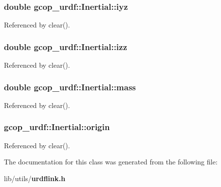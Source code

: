 \subsubsection[{iyz}]{\setlength{\rightskip}{0pt plus 5cm}double {\bf gcop\-\_\-urdf\-::\-Inertial\-::iyz}}\label{classgcop__urdf_1_1Inertial_adeb4c3709ef7e2b95e59c254ea6e0fdd}


\-Referenced by clear().

\subsubsection[{izz}]{\setlength{\rightskip}{0pt plus 5cm}double {\bf gcop\-\_\-urdf\-::\-Inertial\-::izz}}\label{classgcop__urdf_1_1Inertial_a3c72ecbab785b84c84880445a9ea946f}


\-Referenced by clear().

\subsubsection[{mass}]{\setlength{\rightskip}{0pt plus 5cm}double {\bf gcop\-\_\-urdf\-::\-Inertial\-::mass}}\label{classgcop__urdf_1_1Inertial_af3274e540b44fa0ceb334067b7c13b89}


\-Referenced by clear().

\subsubsection[{origin}]{ {\bf gcop\-\_\-urdf\-::\-Inertial\-::origin}}\label{classgcop__urdf_1_1Inertial_a2927992626c1d1fcf86fea895e7e05fd}


\-Referenced by clear().



\-The documentation for this class was generated from the following file\-:\begin{DoxyCompactItemize}
\item 
lib/utils/{\bf urdflink.\-h}\end{DoxyCompactItemize}
